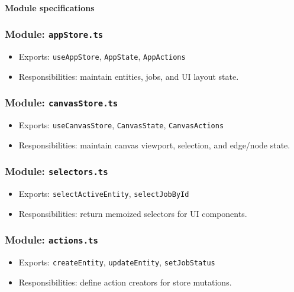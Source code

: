 \documentclass[11pt]{article}
\begin{document}
\paragraph{Module specifications}
\subsubsection*{Module: \texttt{appStore.ts}}
\begin{itemize}[noitemsep]
  \item Exports: \texttt{useAppStore}, \texttt{AppState}, \texttt{AppActions}
  \item Responsibilities: maintain entities, jobs, and UI layout state.
\end{itemize}

\subsubsection*{Module: \texttt{canvasStore.ts}}
\begin{itemize}[noitemsep]
  \item Exports: \texttt{useCanvasStore}, \texttt{CanvasState}, \texttt{CanvasActions}
  \item Responsibilities: maintain canvas viewport, selection, and edge/node state.
\end{itemize}

\subsubsection*{Module: \texttt{selectors.ts}}
\begin{itemize}[noitemsep]
  \item Exports: \texttt{selectActiveEntity}, \texttt{selectJobById}
  \item Responsibilities: return memoized selectors for UI components.
\end{itemize}

\subsubsection*{Module: \texttt{actions.ts}}
\begin{itemize}[noitemsep]
  \item Exports: \texttt{createEntity}, \texttt{updateEntity}, \texttt{setJobStatus}
  \item Responsibilities: define action creators for store mutations.
\end{itemize}
\end{document}
